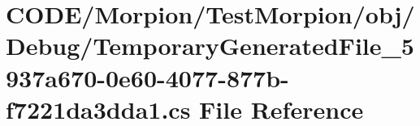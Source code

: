 \hypertarget{_test_morpion_2obj_2_debug_2_temporary_generated_file__5937a670-0e60-4077-877b-f7221da3dda1_8cs}{}\section{C\+O\+D\+E/\+Morpion/\+Test\+Morpion/obj/\+Debug/\+Temporary\+Generated\+File\+\_\+5937a670-\/0e60-\/4077-\/877b-\/f7221da3dda1.cs File Reference}
\label{_test_morpion_2obj_2_debug_2_temporary_generated_file__5937a670-0e60-4077-877b-f7221da3dda1_8cs}
